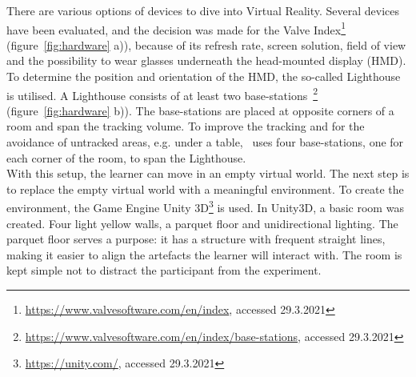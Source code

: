 There are various options of devices to dive into Virtual Reality. Several devices have been evaluated, and the decision was made for the Valve Index\footnote{\href{https://www.valvesoftware.com/en/index}{https://www.valvesoftware.com/en/index}, accessed 29.3.2021} (figure~\ref{fig:hardware} a)), because of its refresh rate, screen solution, field of view and the possibility to wear glasses underneath the head-mounted display (HMD). To determine the position and orientation of the HMD, the so-called Lighthouse is utilised. A Lighthouse consists of at least two base-stations~\footnote{\href{https://www.valvesoftware.com/en/index/base-stations}{https://www.valvesoftware.com/en/index/base-stations}, accessed 29.3.2021} (figure~\ref{fig:hardware} b)). The base-stations are placed at opposite corners of a room and span the tracking volume. To improve the tracking and for the avoidance of untracked areas, e.g. under a table, \exgo\ uses four base-stations, one for each corner of the room, to span the Lighthouse.\\
With this setup, the learner can move in an empty virtual world. The next step is to replace the empty virtual world with a meaningful environment. To create the environment, the Game Engine Unity 3D\footnote{\href{https://unity.com/}{https://unity.com/}, accessed 29.3.2021} is used. In Unity3D, a basic room was created. Four light yellow walls, a parquet floor and unidirectional lighting. The parquet floor serves a purpose: it has a structure with frequent straight lines, making it easier to align the artefacts the learner will interact with. The room is kept simple not to distract the participant from the experiment.\\
